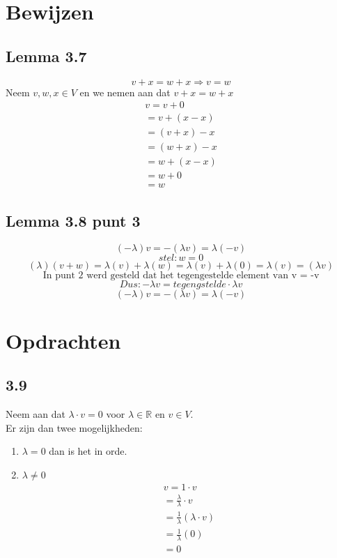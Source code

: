 \documentclass[lineaire_algebra_oplossingen.tex]{subfiles}
\begin{document}
\section{Bewijzen}
\subsection{Lemma 3.7}

$$v+x = w + x \Rightarrow v=w$$
Neem $v,w,x \in V$ en we nemen aan dat $v+x = w+x$\\
\begin{align*}
v = v + 0 \tag{neutraal element}\\
= v + (x - x) \tag{invers element}\\
=(v+x) -x \tag{communativiteit}\\
=(w+x) -x \tag{dit hebben we aangenomen}\\
= w +(x-x) \tag{communitativiteit}\\
= w+0 \tag{invers element}\\
=w \tag{neutraal element}
\end{align*}

\subsection{Lemma 3.8 punt 3}
\[(-\lambda)v = -(\lambda v) = \lambda(-v)\]
\[stel:w=0\]
\[(\lambda)(v+w) = \lambda(v) + \lambda(w) = \lambda(v) + \lambda(0) = \lambda(v) = (\lambda v) \]
\[\text{In punt 2 werd gesteld dat het tegengestelde element van v = -v}\]
\[Dus: -\lambda v = tegengstelde \cdot \lambda v\]
\[(-\lambda)v = -(\lambda v) = \lambda(-v) \]

\section{Opdrachten}
\subsection{3.9}
Neem aan dat $\lambda \cdot v = 0$ voor $\lambda \in \mathbb{R}$ en $v \in V$.\\
Er zijn dan twee mogelijkheden:\\
\begin{enumerate}
\item $\lambda = 0$ dan is het in orde.
\item $\lambda \neq 0$
\begin{align*}
v = 1\cdot v \tag{co\"efficient}
\\
= \frac{\lambda}{\lambda}\cdot v
\\
= \frac{1}{\lambda}(\lambda \cdot v) \tag{gemegde associativiteit}
\\
= \frac{1}{\lambda}(0) \tag{lemma 3.8.1}
\\
= 0
\end{align*}

\end{enumerate}
\end{document}
